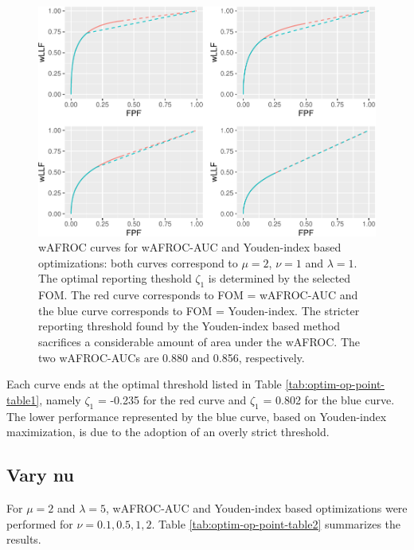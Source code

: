 \documentclass[
]{book}
\begin{document}
\begin{figure}
\centering
\includegraphics{21-optim-op-point_files/figure-latex/optim-op-point-vary-lambda-wafroc-1.pdf}
\caption{\label{fig:optim-op-point-vary-lambda-wafroc}wAFROC curves for wAFROC-AUC and Youden-index based optimizations: both curves correspond to \(\mu = 2\), \(\nu = 1\) and \(\lambda = 1\). The optimal reporting theshold \(\zeta_1\) is determined by the selected FOM. The red curve corresponds to FOM = wAFROC-AUC and the blue curve corresponds to FOM = Youden-index. The stricter reporting threshold found by the Youden-index based method sacrifices a considerable amount of area under the wAFROC. The two wAFROC-AUCs are 0.880 and 0.856, respectively.}
\end{figure}

Each curve ends at the optimal threshold listed in Table \ref{tab:optim-op-point-table1}, namely \(\zeta_1\) = -0.235 for the red curve and \(\zeta_1\) = 0.802 for the blue curve. The lower performance represented by the blue curve, based on Youden-index maximization, is due to the adoption of an overly strict threshold.

\hypertarget{optim-op-point-vary-nu}{%
\subsection{Vary nu}\label{optim-op-point-vary-nu}}

For \(\mu = 2\) and \(\lambda= 5\), wAFROC-AUC and Youden-index based optimizations were performed for \(\nu = 0.1,0.5,1,2\). Table \ref{tab:optim-op-point-table2} summarizes the results.
\end{document}
